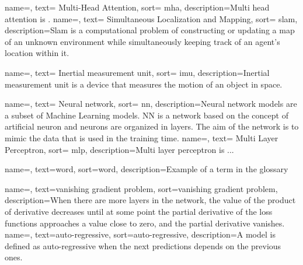 \renewcommand{\acronymname}{Acronimi e abbreviazioni}

{
    name=,
    text= Multi-Head Attention,
    sort= mha,
    description={Multi head attention is .}
}
{
    name=,
    text= Simultaneous Localization and Mapping,
    sort= slam,
    description={Slam is a computational problem of constructing or updating a map of an unknown environment while simultaneously keeping track of an agent's location within it.}
}

{
    name=,
    text= Inertial measurement unit,
    sort= imu,
    description={Inertial measurement unit is a device that measures the motion of an object in space.} %
}

{
    name=,
    text= Neural network,
    sort= nn,
    description={Neural network models are a subset of Machine Learning models. NN is a network based on the concept of artificial neuron and neurons are organized in layers. The aim of the network is to mimic the data that is used in the training time. }
}
{
    name=,
    text= Multi Layer Perceptron,
    sort= mlp,
    description={Multi layer perceptron is ...}
}



{
    name=,
    text=word,
    sort=word,
    description={Example of a term in the glossary}
}

{
    name=,
    text=vanishing gradient problem,
    sort=vanishing gradient problem,
    description={When there are more layers in the network, the value of the product of derivative decreases until at some point the partial derivative of the loss functions approaches a value close to zero, and the partial derivative vanishes.}
}
{
    name=,
    text=auto-regressive,
    sort=auto-regressive,
    description={A model is defined as auto-regressive when the next predictions depends on the previous ones.} %
}

